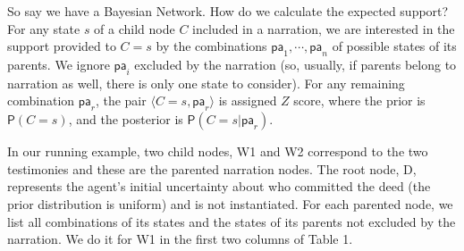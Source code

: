 \documentclass[10pt,]{scrartcl}
\newcommand{\ra}{\rangle}
\newcommand{\la}{\langle}
\newcommand{\pr}{\mathsf{P}}
\newcommand{\s}[1]{\mbox{\textsf{#1}}}
\begin{document}
So say we have a Bayesian Network. How do we calculate the expected support? For any state \(s\) of
a child node \(C\) included in a narration, we are interested in the
support provided to \(C=s\) by the combinations
\(\mathsf{pa}_1, \cdots, \mathsf{pa}_n\) of possible states of its
parents. We ignore \(\mathsf{pa}_i\) excluded by the narration (so, usually, if parents belong to narration as well, there is only one state to consider). For any
remaining combination \(\mathsf{pa}_r\), the pair
\(\la C=s, \mathsf{pa}_r\ra\) is assigned  $Z$ score, where the prior is $\pr(C=s)$, and the posterior is $\pr(C=s \vert \mathsf{pa}_r)$.

In our running example, two child nodes, \textsf{W1} and
\textsf{W2} correspond to the two testimonies and these are the parented narration nodes.
 The root node, \textsf{D},
 represents the agent's initial uncertainty about who
committed the deed (the prior distribution is uniform) and is not
instantiated. 
For each parented node,  we list all combinations  of its states and the states of its parents not excluded by the narration. We do it for \textsf{W1} in the first two columns of Table 1.


\begin{table}
\begin{table}[H]
\centering
{}
\end{table}
\caption{ECS calculation table for \s{W1} in the first scenario in the \s{Witness} problem.}
\label{t:w1}
\end{table}
\end{document}

